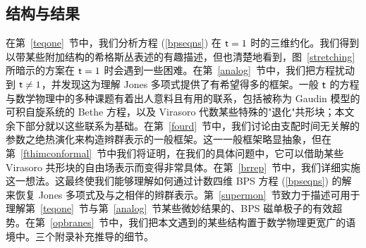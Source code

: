 \subsection{结构与结果}\label{results}

在第~\ref{teqone}~节中，我们分析方程 (\ref{bpseqns}) 在 ${ \sf t}=1$ 时的三维约化。我们得到以带某些附加结构的希格斯丛表述的有趣描述，但也清楚地看到，图~\ref{stretching} 所暗示的方案在 ${ \sf t}=1$ 时会遇到一些困难。在第~\ref{analog}~节中，我们把方程扰动到 ${ \sf t}\not=1$，并发现这为理解 Jones 多项式提供了有希望得多的框架。一般 ${ \sf t}$ 的方程与数学物理中的多种课题有着出人意料且有用的联系，包括被称为 Gaudin 模型的可积自旋系统的 Bethe 方程，以及 Virasoro 代数某些特殊的"退化"共形块；本文余下部分就以这些联系为基础。在第~\ref{fourd}~节中，我们讨论由支配时间无关解的参数之绝热演化来构造辫群表示的一般框架。这一一般框架略显抽象，但在第~\ref{fthimconformal}~节中我们将证明，在我们的具体问题中，它可以借助某些 Virasoro 共形块的自由场表示而变得非常具体。在第~\ref{brrep}~节中，我们详细实施这一想法。这最终使我们能够理解如何通过计数四维 BPS 方程 (\ref{bpseqns}) 的解来恢复 Jones 多项式及与之相伴的辫群表示。第~\ref{supermon}~节致力于描述可用于理解第~\ref{teqone}~节与第~\ref{analog}~节某些微妙结果的、BPS 磁单极子的有效超势。在第~\ref{opbranes}~节中，我们把本文遇到的某些结构置于数学物理更宽广的语境中。三个附录补充推导的细节。

